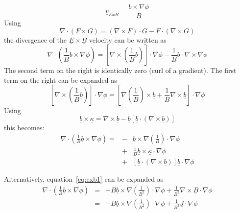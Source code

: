 \documentclass[12pt]{article}
\begin{document}
\[
\underline{v}_{ExB} = \frac{\underline{b}\times\nabla\phi}{B}
\]
Using
\[
\nabla\cdot\left(\underline{F}\times\underline{G}\right) = \left(\nabla\times\underline{F}\right)\cdot\underline{G} - \underline{F}\cdot\left(\nabla\times\underline{G}\right)
\]
the divergence of the $\underline{E}\times\underline{B}$ velocity
can be written as 
\begin{equation}
\nabla\cdot\left(\frac{1}{B}\underline{b}\times\nabla\phi\right) = \left[\nabla\times\left(\frac{1}{B}\underline{b}\right)\right]\cdot\nabla\phi - \frac{1}{B}\underline{b}\cdot\nabla\times\nabla\phi
\label{eq:exb1}
\end{equation}
The second term on the right is identically zero (curl of a gradient). The first term on the right can be expanded as
\[
\left[\nabla\times\left(\frac{1}{B}\underline{b}\right)\right]\cdot\nabla\phi = \left[\nabla\left(\frac{1}{B}\right)\times\underline{b} + \frac{1}{B}\nabla\times\underline{b}\right]\cdot\nabla\phi
\]
Using
\[
\underline{b}\times\underline{\kappa} = \nabla\times\underline{b} - \underline{b}\left[\underline{b}\cdot\left(\nabla\times\underline{b}\right)\right]
\]
this becomes:
\begin{eqnarray*}
  \nabla\cdot\left(\frac{1}{B}\underline{b}\times\nabla\phi\right) = &-&\underline{b}\times\nabla\left(\frac{1}{B}\right)\cdot\nabla\phi \\
  &+& \frac{1}{B}\underline{b}\times\underline{\kappa}\cdot\nabla\phi \\
  &+& \left[\underline{b}\cdot\left(\nabla\times\underline{b}\right)\right]\underline{b}\cdot\nabla\phi
\end{eqnarray*}

Alternatively, equation~\ref{eq:exb1} can be expanded as
\begin{eqnarray*}
  \nabla\cdot\left(\frac{1}{B}\underline{b}\times\nabla\phi\right) &=& -B\underline{b}\times\nabla\left(\frac{1}{B^2}\right)\cdot\nabla\phi + \frac{1}{B^2}\nabla\times\underline{B}\cdot\nabla\phi \\
  &=& -B\underline{b}\times\nabla\left(\frac{1}{B^2}\right)\cdot\nabla\phi + \frac{1}{B^2}\underline{J}\cdot\nabla\phi
\end{eqnarray*}
\end{document}
